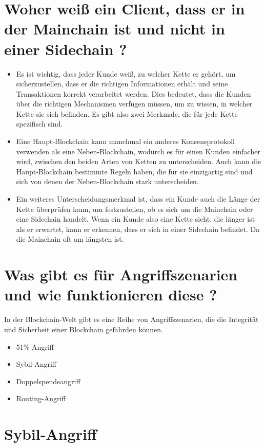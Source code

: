 \documentclass[ngerman]{scrreprt}
\begin{document}
\section{Woher weiß ein Client, dass er in der Mainchain ist und nicht in einer Sidechain ?}
\begin{itemize}
	\item Es ist wichtig, dass jeder Kunde weiß, zu welcher Kette er gehört, um sicherzustellen, dass er die richtigen Informationen erhält und seine Transaktionen korrekt verarbeitet werden. Dies bedeutet, dass die Kunden über die richtigen Mechanismen verfügen müssen, um zu wissen, in welcher Kette sie sich befinden. Es gibt also zwei Merkmale, die für jede Kette spezifisch sind.
	
	\item Eine Haupt-Blockchain kann manchmal ein anderes Konsensprotokoll verwenden als eine Neben-Blockchain, wodurch es für einen Kunden einfacher wird, zwischen den beiden Arten von Ketten zu unterscheiden. Auch kann die Haupt-Blockchain bestimmte Regeln haben, die für sie einzigartig sind und sich von denen der Neben-Blockchain stark unterscheiden.
	
	\item Ein weiteres Unterscheidungsmerkmal ist, dass ein Kunde auch die Länge der Kette überprüfen kann, um festzustellen, ob es sich um die Mainchain oder eine Sidechain handelt. Wenn ein Kunde also eine Kette sieht, die länger ist als er erwartet, kann er erkennen, dass er sich in einer Sidechain befindet. Da die Mainchain oft am längsten ist.
\end{itemize}


\section{Was gibt es für Angriffszenarien und wie funktionieren diese ?}
In der Blockchain-Welt gibt es eine Reihe von Angriffszenarien, die die Integrität und Sicherheit einer Blockchain gefährden können. 
\begin{itemize}
	\item 51\% Angriff
	\item Sybil-Angriff
	\item Doppelspendeangriff
	\item Routing-Angriff
\end{itemize}


\section{Sybil-Angriff}
\end{document}
